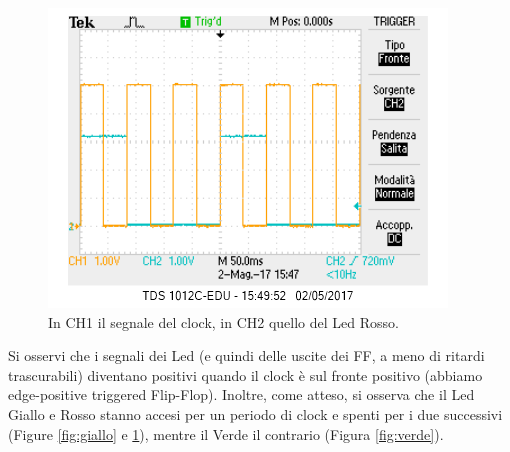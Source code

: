 \documentclass[10pt,a4paper]{article}
\begin{document}
\begin{figure}[!htb]
\centering
\includegraphics[scale=0.7]{clock-rosso.png}
\caption{In CH1 il segnale del clock, in CH2 quello del Led Rosso.\label{fig:rosso}}
\end{figure}
Si osservi che i segnali dei Led (e quindi delle uscite dei FF, a meno di ritardi trascurabili) diventano positivi quando il clock è sul fronte positivo (abbiamo edge-positive triggered Flip-Flop).
Inoltre, come atteso, si osserva che il Led Giallo e Rosso stanno accesi per un periodo di clock e spenti per i due successivi (Figure \ref{fig:giallo} e \ref{fig:rosso}), mentre il Verde il contrario (Figura \ref{fig:verde}).
\end{document}
